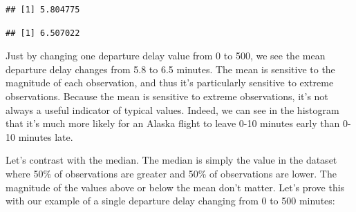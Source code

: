 \documentclass[
]{book}
\newenvironment{Shaded}{\begin{snugshade}}{\end{snugshade}}
\newcommand{\AttributeTok}[1]{\textcolor[rgb]{0.13,0.29,0.53}{#1}}
\newcommand{\CommentTok}[1]{\textcolor[rgb]{0.56,0.35,0.01}{\textit{#1}}}
\newcommand{\DecValTok}[1]{\textcolor[rgb]{0.00,0.00,0.81}{#1}}
\newcommand{\FunctionTok}[1]{\textcolor[rgb]{0.13,0.29,0.53}{\textbf{#1}}}
\newcommand{\NormalTok}[1]{#1}
\newcommand{\OtherTok}[1]{\textcolor[rgb]{0.56,0.35,0.01}{#1}}
\newcommand{\SpecialCharTok}[1]{\textcolor[rgb]{0.81,0.36,0.00}{\textbf{#1}}}
\begin{document}
\begin{Shaded}
\end{Shaded}

\begin{verbatim}
## [1] 5.804775
\end{verbatim}

\begin{Shaded}
\end{Shaded}

\begin{verbatim}
## [1] 6.507022
\end{verbatim}

Just by changing one departure delay value from 0 to 500, we see the mean departure delay changes from 5.8 to 6.5 minutes. The mean is sensitive to the magnitude of each observation, and thus it's particularly sensitive to extreme observations. Because the mean is sensitive to extreme observations, it's not always a useful indicator of typical values. Indeed, we can see in the histogram that it's much more likely for an Alaska flight to leave 0-10 minutes early than 0-10 minutes late.

Let's contrast with the median. The median is simply the value in the dataset where 50\% of observations are greater and 50\% of observations are lower. The magnitude of the values above or below the mean don't matter. Let's prove this with our example of a single departure delay changing from 0 to 500 minutes:
\end{document}

